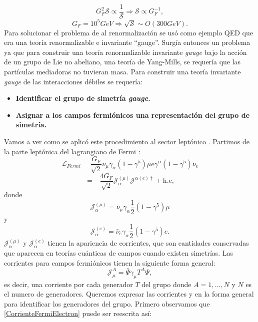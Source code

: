 \documentclass{article}
\theoremstyle{plain}
\theoremstyle{definition}
\begin{document}
\[
G_F^2\mathcal{S}\propto\frac{1}{\mathcal{S}}\Rightarrow\mathcal{S}\propto G_F^{-1},
\] 	
\[
G_F = 10^5 GeV\Rightarrow\sqrt{\mathcal{S}} \sim O(300GeV)\text{.}
\]
Para solucionar el problema de al renormalización se usó como ejemplo QED que era una teoría renormalizable e invariante ``gauge''. 	
	Surgía entonces un problema ya que para construir una teoría renormalizable invariante \textit{gauge} bajo la acción de  un grupo de Lie no abeliano, una teoría de Yang-Mills, se requería que las partículas mediadoras no tuvieran masa. Para construir una teoría invariante \textit{gauge} de las interacciones débiles se requería:
	\begin{itemize}
		\item \textbf{Identificar el grupo de simetría \textit{gauge}.}
		\item \textbf{Asignar a los campos fermiónicos una representación del grupo de simetría.}
	\end{itemize}
	Vamos a ver como se aplicó este procedimiento al sector leptónico  \cite{PhysRevLett.19.1264}. Partimos de la parte leptónica del lagrangiano de Fermi : \[
	\mathcal{L}_{Fermi}  = \frac{G_F}{\sqrt{2}} \bar{\nu} _\mu\gamma_\alpha(1-\gamma^5) \mu \bar{e}\gamma^\alpha(1-\gamma^5)\nu_e 
	\]
	\begin{dmath}\label{FermiLagrangianLeptons}
		= -\frac{4G_F}{\sqrt{2}}\mathcal{J}_\alpha^{(\mu)}\mathcal{J}^{\alpha(e)\dagger}+ \text{h.c},
	\end{dmath}
	donde 
	\begin{dmath}\label{CorrienteFermiMuon}
		\mathcal{J}_\alpha^{(\mu)} = \bar{\nu} _\mu\gamma_\alpha\frac{1}{2}(1-\gamma^5) \mu
	\end{dmath}
	y 
	\begin{dmath}\label{CorrienteFermiElectron}
		\mathcal{J}_\alpha^{(e)} = \bar{\nu}_e\gamma_\alpha\frac{1}{2}(1-\gamma^5)e\text{.} 
	\end{dmath}
	\(\mathcal{J}_\alpha^{(\mu)}\) y \(\mathcal{J}_\alpha^{(e)}\) tienen la apariencia de corrientes, que son cantidades conservadas que aparecen en teorías cuánticas de campos cuando existen simetrías. Las corrientes para campos fermiónicos tienen la siguiente forma general: 
	\begin{dmath}\label{CorrienteFermionGeneral}
		\mathcal{J}_\mu^{A} = \bar{\Psi}\gamma_{\mu}T^A\Psi,
	\end{dmath}
	es decir, una corriente por cada generador \(T\) del grupo donde \(A=1,\dots,N\) y \(N\) es el numero de generadores. Queremos expresar las corrientes  y  en la forma general  para identificar los generadores del grupo. Primero observamos que \ref{CorrienteFermiElectron} puede ser reescrita así: 
\end{document}
